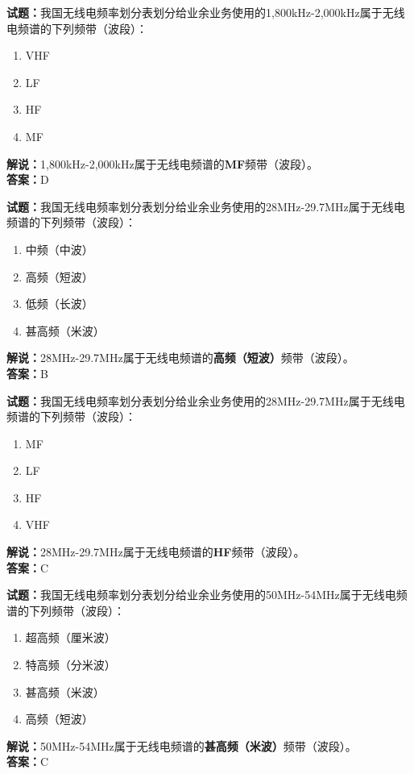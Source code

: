 \documentclass{ctexbook}
\begin{document}
\vspace{\baselineskip}

\noindent\textbf{试题：}我国无线电频率划分表划分给业余业务使用的1,800\unit{\kHz}-2,000\unit{\kHz}属于无线电频谱的下列频带（波段）：
\begin{enumerate}[leftmargin=3em]
  \item VHF
  \item LF
  \item HF
  \item MF
\end{enumerate}
\noindent\textbf{解说：}1,800\unit{\kHz}-2,000\unit{\kHz}属于无线电频谱的\textbf{MF}频带（波段）。\\\noindent\textbf{答案：}D

\vspace{\baselineskip}

\noindent\textbf{试题：}我国无线电频率划分表划分给业余业务使用的28\unit{\MHz}-29.7\unit{\MHz}属于无线电频谱的下列频带（波段）：
\begin{enumerate}[leftmargin=3em]
  \item 中频（中波）
  \item 高频（短波）
  \item 低频（长波）
  \item 甚高频（米波）
\end{enumerate}
\noindent\textbf{解说：}28\unit{\MHz}-29.7\unit{\MHz}属于无线电频谱的\textbf{高频（短波）}频带（波段）。\\\noindent\textbf{答案：}B

\vspace{\baselineskip}

\noindent\textbf{试题：}我国无线电频率划分表划分给业余业务使用的28\unit{\MHz}-29.7\unit{\MHz}属于无线电频谱的下列频带（波段）：
\begin{enumerate}[leftmargin=3em]
  \item MF
  \item LF
  \item HF
  \item VHF
\end{enumerate}
\noindent\textbf{解说：}28\unit{\MHz}-29.7\unit{\MHz}属于无线电频谱的\textbf{HF}频带（波段）。\\\noindent\textbf{答案：}C

\vspace{\baselineskip}

\noindent\textbf{试题：}我国无线电频率划分表划分给业余业务使用的50\unit{\MHz}-54\unit{\MHz}属于无线电频谱的下列频带（波段）：
\begin{enumerate}[leftmargin=3em]
  \item 超高频（厘米波）
  \item 特高频（分米波）
  \item 甚高频（米波）
  \item 高频（短波）
\end{enumerate}
\noindent\textbf{解说：}50\unit{\MHz}-54\unit{\MHz}属于无线电频谱的\textbf{甚高频（米波）}频带（波段）。\\\noindent\textbf{答案：}C
\end{document}
